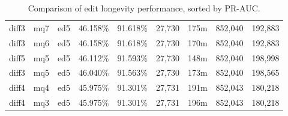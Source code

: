 \begin{sidewaystable}[!ph]
\begin{center}
\begin{tabular}{|c|c|c||c|c||c|c|c|c|}
diff3 & mq7 & ed5 & 46.158\% & 91.618\% & 27,730 & 175m & 852,040 & 192,883 \\
diff3 & mq6 & ed5 & 46.158\% & 91.618\% & 27,730 & 170m & 852,040 & 192,883 \\
diff5 & mq5 & ed5 & 46.112\% & 91.593\% & 27,730 & 148m & 852,040 & 198,998 \\
diff3 & mq5 & ed5 & 46.040\% & 91.563\% & 27,730 & 173m & 852,040 & 198,565 \\
diff4 & mq4 & ed5 & 45.975\% & 91.301\% & 27,731 & 191m & 852,043 & 180,218 \\
diff4 & mq3 & ed5 & 45.975\% & 91.301\% & 27,731 & 196m & 852,043 & 180,218 \\
\hline
\end{tabular}
\end{center}
\caption{Comparison of edit longevity performance,
    sorted by PR-AUC.}
\label{tab:editshoutB}
\end{sidewaystable}
\clearpage
